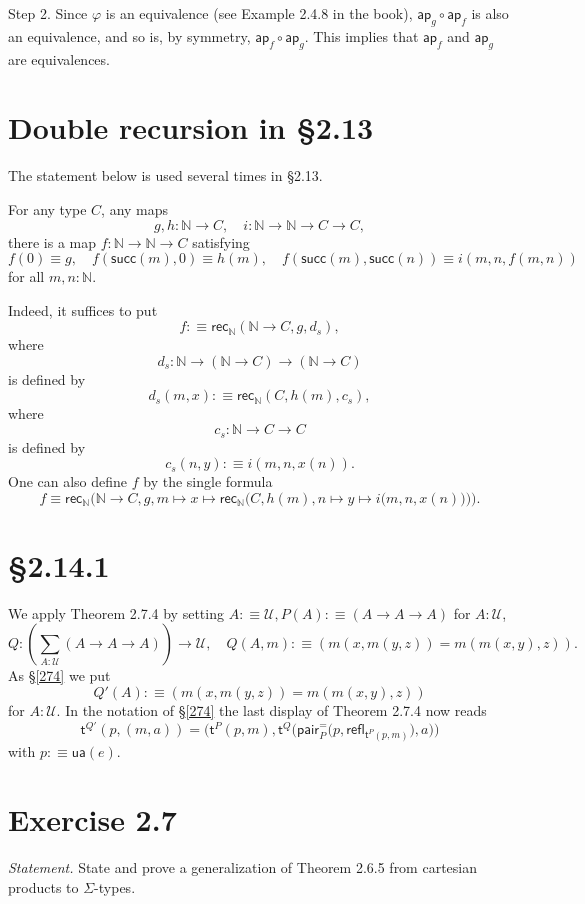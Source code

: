 \documentclass[12pt]{article}
\newcommand{\msf}{\mathsf}
\newcommand{\ap}{\mathsf{ap}}
\newcommand{\de}{:\equiv}
\newcommand{\N}{\mathbb N}
\newcommand{\pa}{\mathsf{pair}^=}
\newcommand{\rec}{\mathsf{rec}}
\newcommand{\refl}{\mathsf{refl}}
\newcommand{\su}{\mathsf{succ}}
\newcommand{\U}{\mathcal U}
\begin{document}
Step 2. Since $\varphi$ is an equivalence (see Example 2.4.8 in the book), $\ap_g\circ\ap_f$ is also an equivalence, and so is, by symmetry, $\ap_f\circ\ap_g$. This implies that $\ap_f$ and $\ap_g$ are equivalences.



\section{Double recursion in \S2.13}

The statement below is used several times in \S2.13.

For any type $C$, any maps 
$$
g,h:\N\to C,\quad i:\N\to\N\to C\to C,
$$ 
there is a map $f:\N\to\N\to C$ satisfying 
$$
f(0)\equiv g,\quad f(\su(m),0)\equiv h(m),\quad f(\su(m),\su(n))\equiv i(m,n,f(m,n))
$$ 
for all $m,n:\N$.

Indeed, it suffices to put 
$$
f:\equiv\rec_\N(\N\to C,g,d_s),
$$ 
where 
$$
d_s:\N\to(\N\to C)\to(\N\to C)
$$ 
is defined by 
$$
d_s(m,x):\equiv\rec_\N(C,h(m),c_s),
$$ 
where 
$$
c_s:\N\to C\to C
$$ 
is defined by 
$$
c_s(n,y):\equiv i(m,n,x(n)).
$$ 
One can also define $f$ by the single formula
$$
f\equiv\rec_\N\Bigg(\N\to C,g,m\mapsto x\mapsto\rec_\N\bigg(C,h(m),n\mapsto y\mapsto i\big(m,n,x(n)\big)\bigg)\Bigg).
$$


\section{\S2.14.1}

We apply Theorem 2.7.4 by setting $A\de\U,P(A)\de(A\to A\to A)$ for $A:\U$, 
$$
Q:\left(\sum_{A:\U}(A\to A\to A)\right)\to\U,\quad Q(A,m)\de(m(x,m(y,z))=m(m(x,y),z)).
$$ 
As \S\ref{274} we put 
$$
Q'(A)\de(m(x,m(y,z))=m(m(x,y),z))
$$ 
for $A:\U$. In the notation of \S\ref{274} the last display of Theorem 2.7.4 now reads 
$$
\msf t^{Q'}(p,(m,a))=\Bigg(\msf t^P(p,m),\msf t^Q\bigg(\pa_P\Big(p,\refl_{\msf t^P(p,m)}\Big),a\bigg)\Bigg)
$$ 
with $p\de\msf{ua}(e)$.


\section{Exercise 2.7}

\emph{Statement.} State and prove a generalization of Theorem 2.6.5 from cartesian products to $\Sigma$-types. 
\end{document}
